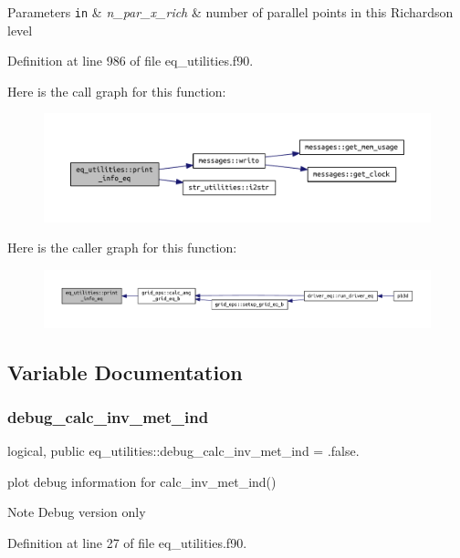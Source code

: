 \begin{DoxyParams}[1]{Parameters}
\mbox{\tt in}  & {\em n\+\_\+par\+\_\+x\+\_\+rich} & number of parallel points in this Richardson level \\
\hline
\end{DoxyParams}


Definition at line 986 of file eq\+\_\+utilities.\+f90.

Here is the call graph for this function\+:\nopagebreak
\begin{figure}[H]
\begin{center}
\leavevmode
\includegraphics[width=350pt]{namespaceeq__utilities_a40f397d20b45432117744ca16870ddbb_cgraph}
\end{center}
\end{figure}
Here is the caller graph for this function\+:\nopagebreak
\begin{figure}[H]
\begin{center}
\leavevmode
\includegraphics[width=350pt]{namespaceeq__utilities_a40f397d20b45432117744ca16870ddbb_icgraph}
\end{center}
\end{figure}


\subsection{Variable Documentation}
\mbox{\label{namespaceeq__utilities_aedf0e1858d0bd16218a290f4857d416a}} 
\subsubsection{\texorpdfstring{debug\+\_\+calc\+\_\+inv\+\_\+met\+\_\+ind}{debug\_calc\_inv\_met\_ind}}
{\footnotesize\ttfamily logical, public eq\+\_\+utilities\+::debug\+\_\+calc\+\_\+inv\+\_\+met\+\_\+ind = .false.}



plot debug information for calc\+\_\+inv\+\_\+met\+\_\+ind() 

\begin{DoxyNote}{Note}
Debug version only 
\end{DoxyNote}


Definition at line 27 of file eq\+\_\+utilities.\+f90.

